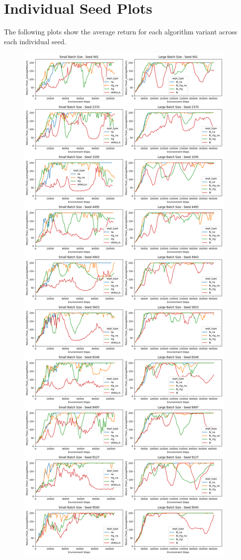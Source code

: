 \documentclass{article} %
\begin{document}
\section{Individual Seed Plots} \label{sec:indiv_seed_plots}
The following plots show the average return for each algorithm variant across each individual seed.
\begin{figure}[p]
    \centering
    \captionsetup{justification=centering}
    \includegraphics[width = \linewidth, height = 0.95\textheight]{plots/return-vs-env-steps-seeds.png}

\end{figure}
\end{document}
